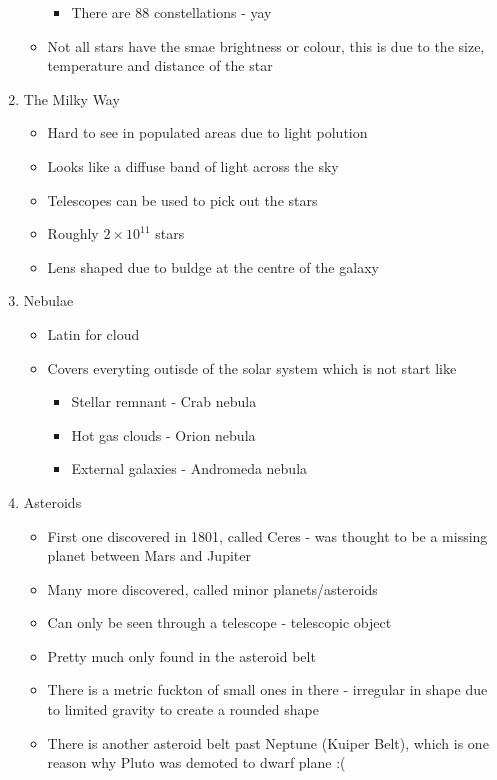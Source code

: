 \documentclass[a4paper, 12pt]{article}
\begin{document}
\begin{enumerate}
\begin{itemize}
\begin{itemize}
		\item There are 88 constellations - yay
		\end{itemize}
	\item Not all stars have the smae brightness or colour, this is due to the size, temperature and distance of the star
	\end{itemize}
\item The Milky Way
	\begin{itemize}
	\item Hard to see in populated areas due to light polution
	\item Looks like a diffuse band of light across the sky
	\item Telescopes can be used to pick out the stars
	\item Roughly \(2\times10^{11}\) stars
	\item Lens shaped due to buldge at the centre of the galaxy
	\end{itemize}
\item Nebulae
	\begin{itemize}
	\item Latin for cloud
	\item Covers everyting outisde of the solar system which is not start like
		\begin{itemize}
		\item Stellar remnant - Crab nebula
		\item Hot gas clouds - Orion nebula
		\item External galaxies - Andromeda nebula
		\end{itemize}
	\end{itemize}
\item Asteroids
	\begin{itemize}
	\item First one discovered in 1801, called Ceres - was thought to be a missing planet between Mars and Jupiter
	\item Many more discovered, called minor planets/asteroids
	\item Can only be seen through a telescope - telescopic object
	\item Pretty much only found in the asteroid belt
	\item There is a metric fuckton of small ones in there - irregular in shape due to limited gravity to create a rounded shape
	\item There is another asteroid belt past Neptune (Kuiper Belt), which is one reason why Pluto was demoted to dwarf plane :(
	\end{itemize}

\end{enumerate}
\end{document}
